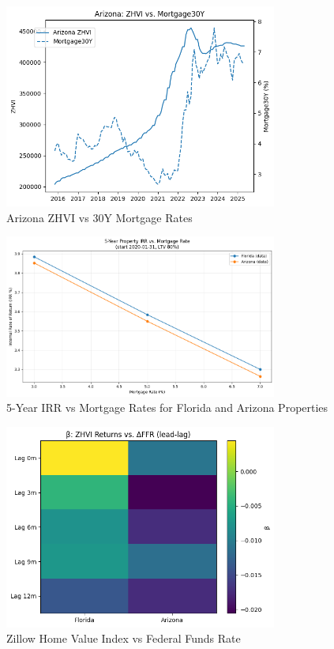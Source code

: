 \documentclass[12pt, stu, abstract]{apa7}
\begin{document}
\begin{appendices}
\begin{figure}[htbp]
    \centering
    \includegraphics[width=0.8\textwidth]{../figs/az_zhvi_vs_mort.png}
    \caption{Arizona ZHVI vs 30Y Mortgage Rates}
    \label{fig:az_zhvi}
\end{figure}

\begin{figure}[htbp]
    \centering
    \includegraphics[width=0.8\textwidth]{../figs/irr_vs_mort.png}
    \caption{5-Year IRR vs Mortgage Rates for Florida and Arizona Properties}
    \label{fig:irr_mort}
\end{figure}

\begin{figure}[htbp]
    \centering
    \includegraphics[width=0.8\textwidth]{../figs/zhvi_vs_ffr.png}
    \caption{Zillow Home Value Index vs Federal Funds Rate}
    \label{fig:zhvi_ffr}
\end{figure}


\end{appendices}
\end{document}
